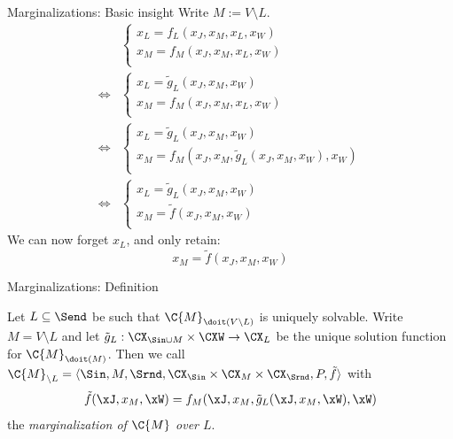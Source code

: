\begin{frame}{Marginalizations: Basic insight}
  Write $M := V \setminus L$.
    \begin{equation*}\begin{split}
  & \begin{cases}
    x_L = f_L(x_J,x_M,x_L,x_W) \\
    x_M = f_M(x_J,x_M,x_L,x_W) \\
  \end{cases} \\
  \iff & \begin{cases}
    x_L = \tilde{g}_L(x_J,x_M,x_W) \\
    x_M = f_M(x_J,x_M,x_L,x_W) \\
  \end{cases}  \\
  \iff & \begin{cases}
    x_L = \tilde{g}_L(x_J,x_M,x_W) \\
    x_M = f_M(x_J,x_M,\tilde{g}_L(x_J,x_M,x_W),x_W) \\
  \end{cases} \\
  \iff & \begin{cases}
    x_L = \tilde{g}_L(x_J,x_M,x_W) \\
    x_M = \tilde{f}(x_J,x_M,x_W) \\
  \end{cases}
  \end{split}\end{equation*}
  We can now forget $x_L$, and only retain:
  $$x_M = \tilde{f}(x_J,x_M,x_W)$$
\end{frame}

\begin{frame}{Marginalizations: Definition}
\begin{Def}
  Let $L \subseteq \Send$ be such that $\C{M}_{\doit(V\setminus L)}$ is uniquely solvable.
  Write $M = V \setminus L$ and let $\tilde{g}_L : \CX_{\Sin \cup M} \times \CXW \to \CX_L$
  be the unique solution function for $\C{M}_{\doit(M)}$.
  Then we call $\C{M}_{\setminus L} = \langle \Sin, M, \Srnd, \CX_{\Sin} \times \CX_{M} \times \CX_{\Srnd}, P, \tilde{f} \rangle$ with
  $$\tilde{f}(\xJ,x_{M},\xW) = f_{M}(\xJ,x_{M},\tilde{g}_L(\xJ,x_{M},\xW),\xW)$$
  the \emph{marginalization of $\C{M}$ over $L$}.
\end{Def}
\end{frame}

